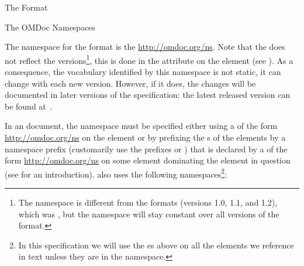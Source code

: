 \begin{omgroup}[creators=miko,id=spec-intro]{The \omdoc Format}
\begin{omgroup}[id=omdoc-ns]{The OMDoc Namespaces}

The namespace for the {} format is the 
\url{http://omdoc.org/ns}. Note that the \omdoc {}
does not reflect the versions\footnote{The namespace is different from the {}
  formats (versions 1.0, 1.1, and 1.2), which was
  {}, but the {} namespace will stay
  constant over all versions of the {} format.}, this is done in the
{} attribute on the {} element
 (see ).  As a consequence, the
\omdoc vocabulary identified by this namespace is not static, it can change with each
new \omdoc version. However, if it does, the changes will be documented in later
versions of the specification: the latest released version can be found
at~\cite{URL:omdocspec}.

In an \omdoc document, the \omdoc namespace must be specified either using a
{} of the form
{}\url{http://omdoc.org/ns}{} on the  element
or by prefixing the {s} of the \omdoc elements by a namespace
prefix (\omdoc customarily use the prefixes {} or {}) that
is declared by a {} of the form
{}\url{http://omdoc.org/ns}{} on some element dominating the
\omdoc element in question (see {} for an introduction). \omdoc also
uses the following namespaces\footnote{In this specification we will use the
  {es} above on all the elements we reference in text unless
  they are in the \omdoc namespace.}:


\end{omgroup}
\end{omgroup}
